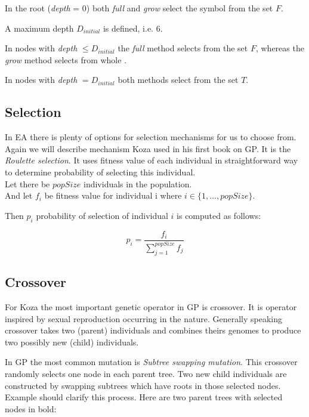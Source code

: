 \documentclass[12pt,a4paper]{report}
\newcommand{\EA}{EA\xspace} %
\newcommand{\setDots}[2]{ 
	\lbrace #1 , \dots , #2 \rbrace
}
\begin{document}
In the root (\textit{depth} = 0) both \textit{full} and \textit{grow}
select the symbol from the set $F$.

A maximum depth $D_{initial}$ is defined, i.e. 6.

In nodes with \textit{depth} $\leq D_{initial}$ the \textit{full}
method selects from the set $F$, whereas the \textit{grow} method 
selects from whole \TuF.

In nodes with \textit{depth} $= D_{initial}$ both methods select from the
set $T$.

\subsection{Selection}

In \EA there is plenty of options for selection mechanisms 
for us to choose from. Again we will describe mechanism Koza
used in his first book on GP. It is the \textit{Roulette selection}.
It uses fitness value of each individual in straightforward way to determine probability of selecting this individual.\\

Let there be $popSize$ individuals in the population.\\
And let $f_{i}$ be fitness value for individual i 
where $i \in \setDots{1}{popSize}$. 

Then $p_{i}$ probability of selection of individual $i$ is computed
as follows:

$$ p_{i} = \dfrac{ f_{i}  }{ \sum\limits_{j=1}^{popSize}{f_{j} }  } $$

\subsection{Crossover}

For Koza the most important genetic operator in GP is 
crossover. It is operator inspired by sexual reproduction
occurring in the nature. Generally speaking crossover takes
two (parent) individuals and combines theirs genomes to produce 
two possibly new (child) individuals.   

In GP the most common mutation is \textit{Subtree swapping mutation}.
This crossover randomly selects one node in each parent tree.
Two new child individuals are constructed by swapping subtrees 
which have roots in those selected nodes.\\

Example should clarify this process. Here are two parent trees with 
selected nodes in bold:
\end{document}
